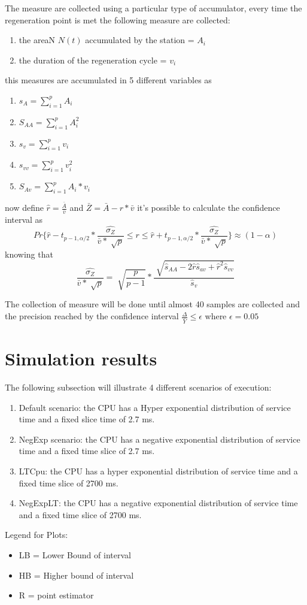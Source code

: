 \documentclass[12pt,a4paper]{article}
\begin{document}
The measure are collected using a particular type of accumulator, every time the regeneration point is met the following measure are collected:
\begin{enumerate}
    \item the areaN $N(t)$ accumulated by the station = $A_i$
    \item the duration of the regeneration cycle = $v_i$
\end{enumerate}

this measures are accumulated in 5 different variables as 
\begin{enumerate}
    \item $s_A=\sum_{i=1}^{p} A_i$
    \item $S_{AA} = \sum_{i=1}^{p} A_i^2$
    \item $s_v = \sum_{i=1}^{p} v_i$
    \item $s_{vv} = \sum_{i=1}^{p} v_i^2$
    \item $S_{Av} = \sum_{i=1}^{p} A_i*v_i$
\end{enumerate}

now define $\hat{r}=\frac{\bar{A}}{\bar{v}}$ and $\bar{Z}=\bar{A}-r*\bar{v}$ it's possible to calculate the confidence interval as 
$$Pr\{\hat{r}-t_{p-1,\alpha/2}* \frac{\hat{\sigma_Z}}{\bar{v}*\sqrt[]{p}}  \leq r \leq \hat{r}+t_{p-1,\alpha/2}* \frac{\hat{\sigma_Z}}{\bar{v}*\sqrt[]{p}} \} \approx (1-\alpha)$$
knowing that 
$$\frac{\hat{\sigma_Z}}{\bar{v}*\sqrt[]{p}} = \sqrt[]{\frac{p}{p-1}}*\frac{\sqrt[]{\hat{s}_{AA}-2\hat{r}\hat{s}_{av}+\hat{r}^2\hat{s}_{vv}}}{\hat{s}_v}$$

The collection of measure will be done until almost 40 samples are collected and the precision reached by the confidence interval $\frac{\Delta}{\bar{Y}} \leq \epsilon$ where $\epsilon = 0.05$ 

\section{Simulation results}
The following subsection will illustrate 4 different scenarios of execution:
\begin{enumerate}
    \item Default scenario: the CPU has a Hyper exponential distribution of service time and a fixed slice time of 2.7 ms.
    \item NegExp scenario: the CPU has a negative exponential distribution of service time and a fixed time slice of 2.7 ms.
    \item LTCpu: the CPU has a hyper exponential distribution of service time and a fixed time slice of 2700 ms.
    \item NegExpLT: the CPU has a negative exponential distribution of service time and a fixed time slice of 2700 ms.
\end{enumerate}
Legend for Plots:
\begin{itemize}
    \item LB = Lower Bound of interval 
    \item HB = Higher bound of interval 
    \item R = point estimator
\end{itemize}
\end{document}
